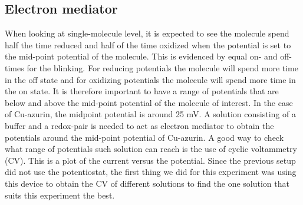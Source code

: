 \documentclass[twoside,single]{lion-msc}
\begin{document}
\subsection{Electron mediator}\label{ferriferro}
When looking at single-molecule level, it is expected to see the molecule spend half the time reduced and half of the time oxidized when the potential is set to the mid-point potential of the molecule. This  is evidenced by equal on- and off-times for the blinking. For reducing potentials the molecule will spend more time in the off state and for oxidizing potentials the molecule will spend more time in the on state. It is therefore important to have a range of potentials that are below and above the mid-point potential of the molecule of interest. In the case of Cu-azurin, the midpoint potential is around 25 mV. A solution consisting of a buffer and a redox-pair is needed to act as electron mediator to obtain the potentials around the mid-point potential of Cu-azurin. A good way to check what range of potentials such solution can reach is the use of cyclic voltammetry (CV). This is a plot of the current versus the potential. Since the previous setup did not use the potentiostat, the first thing we did for this experiment was using this device to obtain the CV of different solutions to find the one solution that suits this experiment the best.
\end{document}
